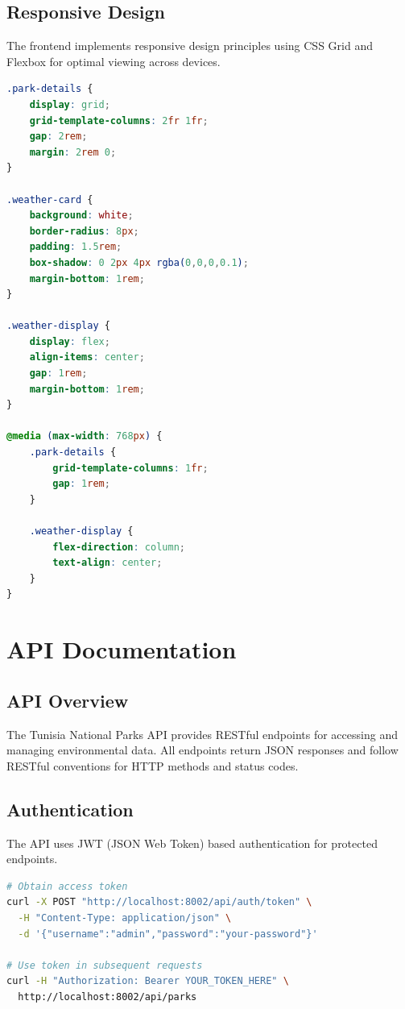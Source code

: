 \documentclass[12pt,a4paper]{report}
\begin{document}
\section{Responsive Design}

The frontend implements responsive design principles using CSS Grid and Flexbox for optimal viewing across devices.

\begin{lstlisting}[language=CSS, caption=Responsive Layout]
.park-details {
    display: grid;
    grid-template-columns: 2fr 1fr;
    gap: 2rem;
    margin: 2rem 0;
}

.weather-card {
    background: white;
    border-radius: 8px;
    padding: 1.5rem;
    box-shadow: 0 2px 4px rgba(0,0,0,0.1);
    margin-bottom: 1rem;
}

.weather-display {
    display: flex;
    align-items: center;
    gap: 1rem;
    margin-bottom: 1rem;
}

@media (max-width: 768px) {
    .park-details {
        grid-template-columns: 1fr;
        gap: 1rem;
    }

    .weather-display {
        flex-direction: column;
        text-align: center;
    }
}
\end{lstlisting}

\chapter{API Documentation}

\section{API Overview}

The Tunisia National Parks API provides RESTful endpoints for accessing and managing environmental data. All endpoints return JSON responses and follow RESTful conventions for HTTP methods and status codes.

\section{Authentication}

The API uses JWT (JSON Web Token) based authentication for protected endpoints.

\begin{lstlisting}[language=bash, caption=Authentication Example]
# Obtain access token
curl -X POST "http://localhost:8002/api/auth/token" \
  -H "Content-Type: application/json" \
  -d '{"username":"admin","password":"your-password"}'

# Use token in subsequent requests
curl -H "Authorization: Bearer YOUR_TOKEN_HERE" \
  http://localhost:8002/api/parks
\end{lstlisting}
\end{document}
